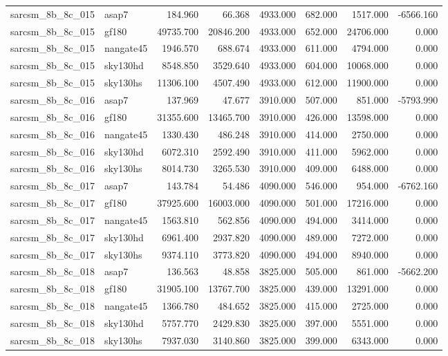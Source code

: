 \begin{tabular}{llrrrrrr}
sarcsm\_8b\_8c\_015 & asap7 & 184.960 & 66.368 & 4933.000 & 682.000 & 1517.000 & -6566.160 \\
sarcsm\_8b\_8c\_015 & gf180 & 49735.700 & 20846.200 & 4933.000 & 652.000 & 24706.000 & 0.000 \\
sarcsm\_8b\_8c\_015 & nangate45 & 1946.570 & 688.674 & 4933.000 & 611.000 & 4794.000 & 0.000 \\
sarcsm\_8b\_8c\_015 & sky130hd & 8548.850 & 3529.640 & 4933.000 & 604.000 & 10068.000 & 0.000 \\
sarcsm\_8b\_8c\_015 & sky130hs & 11306.100 & 4507.490 & 4933.000 & 612.000 & 11900.000 & 0.000 \\
sarcsm\_8b\_8c\_016 & asap7 & 137.969 & 47.677 & 3910.000 & 507.000 & 851.000 & -5793.990 \\
sarcsm\_8b\_8c\_016 & gf180 & 31355.600 & 13465.700 & 3910.000 & 426.000 & 13598.000 & 0.000 \\
sarcsm\_8b\_8c\_016 & nangate45 & 1330.430 & 486.248 & 3910.000 & 414.000 & 2750.000 & 0.000 \\
sarcsm\_8b\_8c\_016 & sky130hd & 6072.310 & 2592.490 & 3910.000 & 411.000 & 5962.000 & 0.000 \\
sarcsm\_8b\_8c\_016 & sky130hs & 8014.730 & 3265.530 & 3910.000 & 409.000 & 6488.000 & 0.000 \\
sarcsm\_8b\_8c\_017 & asap7 & 143.784 & 54.486 & 4090.000 & 546.000 & 954.000 & -6762.160 \\
sarcsm\_8b\_8c\_017 & gf180 & 37925.600 & 16003.000 & 4090.000 & 501.000 & 17216.000 & 0.000 \\
sarcsm\_8b\_8c\_017 & nangate45 & 1563.810 & 562.856 & 4090.000 & 494.000 & 3414.000 & 0.000 \\
sarcsm\_8b\_8c\_017 & sky130hd & 6961.400 & 2937.820 & 4090.000 & 489.000 & 7272.000 & 0.000 \\
sarcsm\_8b\_8c\_017 & sky130hs & 9374.110 & 3773.820 & 4090.000 & 494.000 & 8940.000 & 0.000 \\
sarcsm\_8b\_8c\_018 & asap7 & 136.563 & 48.858 & 3825.000 & 505.000 & 861.000 & -5662.200 \\
sarcsm\_8b\_8c\_018 & gf180 & 31905.100 & 13767.700 & 3825.000 & 439.000 & 13291.000 & 0.000 \\
sarcsm\_8b\_8c\_018 & nangate45 & 1366.780 & 484.652 & 3825.000 & 415.000 & 2725.000 & 0.000 \\
sarcsm\_8b\_8c\_018 & sky130hd & 5757.770 & 2429.830 & 3825.000 & 397.000 & 5551.000 & 0.000 \\
sarcsm\_8b\_8c\_018 & sky130hs & 7937.030 & 3140.860 & 3825.000 & 399.000 & 6343.000 & 0.000 \\

\end{tabular}
